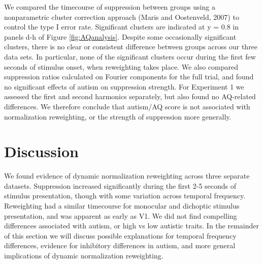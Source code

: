 \documentclass[
]{article}
\begin{document}
We compared the timecourse of suppression between groups using a nonparametric cluster correction approach (Maris and Oostenveld, 2007) to control the type I error rate. Significant clusters are indicated at y = 0.8 in panels d-h of Figure \ref{fig:AQanalysis}. Despite some occasionally significant clusters, there is no clear or consistent difference between groups across our three data sets. In particular, none of the significant clusters occur during the first few seconds of stimulus onset, when reweighting takes place. We also compared suppression ratios calculated on Fourier components for the full trial, and found no significant effects of autism on suppression strength. For Experiment 1 we assessed the first and second harmonics separately, but also found no AQ-related differences. We therefore conclude that autism/AQ score is not associated with normalization reweighting, or the strength of suppression more generally.

\hypertarget{discussion}{%
\section{Discussion}\label{discussion}}

We found evidence of dynamic normalization reweighting across three separate datasets. Suppression increased significantly during the first 2-5 seconds of stimulus presentation, though with some variation across temporal frequency. Reweighting had a similar timecourse for monocular and dichoptic stimulus presentation, and was apparent as early as V1. We did not find compelling differences associated with autism, or high vs low autistic traits. In the remainder of this section we will discuss possible explanations for temporal frequency differences, evidence for inhibitory differences in autism, and more general implications of dynamic normalization reweighting.
\end{document}
